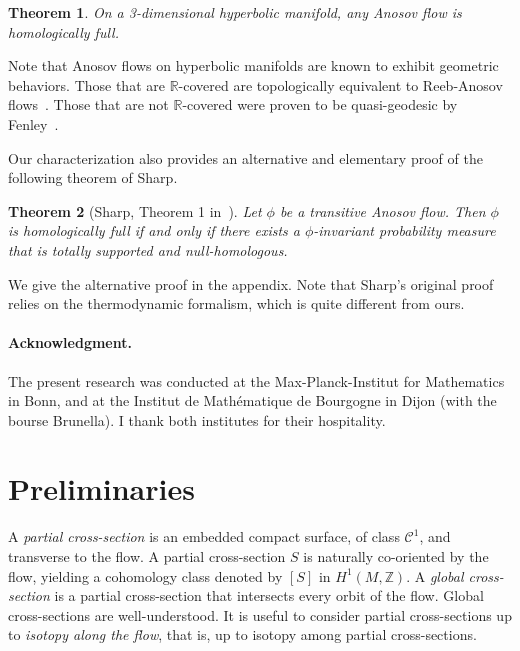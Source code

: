 \documentclass[colorinlistoftodos,12pt]{article}
\newcommand{\RR}{\mathbb{R}}
\newcommand{\ZZ}{\mathbb{Z}}
\newcommand{\Class}{\mathcal{C}}
\theoremstyle{colorplain}
\numberwithin{theorem}{section}
\newtheorem{maintheorem}{Theorem}
\theoremstyle{colorremarkbis}
\theoremstyle{colorremark}
\theoremstyle{colordefinition}
\begin{document}
\begin{maintheorem}\label{thm-hyp-implies-hom-full}
	On a 3-dimensional hyperbolic manifold, any Anosov flow is homologically full.
\end{maintheorem}

Note that Anosov flows on hyperbolic manifolds are known to exhibit geometric behaviors. Those that are $\RR$-covered are topologically equivalent to Reeb-Anosov flows~\cite{marty2023skewed}. Those that are not $\RR$-covered were proven to be quasi-geodesic by Fenley~\cite{fenley2026non}.

\vspace{\baselineskip}

Our characterization also provides an alternative and elementary proof of the following theorem of Sharp. 

\begin{maintheorem}[Sharp, Theorem 1 in~\cite{sharp}]\label{thm-Sharp}
	Let $\phi$ be a transitive Anosov flow. Then $\phi$ is homologically full if and only if there exists a $\phi$-invariant probability measure that is totally supported and null-homologous.
\end{maintheorem}

We give the alternative proof in the appendix. Note that Sharp's original proof relies on the thermodynamic formalism, which is quite different from ours.

\paragraph{Acknowledgment.} The present research was conducted at the Max-Planck-Institut for Mathematics in Bonn, and at the Institut de Mathématique de Bourgogne in Dijon (with the bourse Brunella). I thank both institutes for their hospitality.




\section{Preliminaries}\label{sec-prelem}


A \emph{partial cross-section} is an embedded compact surface, of class $\Class^1$, and transverse to the flow. A partial cross-section $S$ is naturally co-oriented by the flow, yielding a cohomology class denoted by $[S]$ in $H^1(M,\ZZ)$. A \emph{global cross-section} is a partial cross-section that intersects every orbit of the flow. Global cross-sections are well-understood. It is useful to consider partial cross-sections up to \emph{isotopy along the flow}, that is, up to isotopy among partial cross-sections. 
\end{document}
